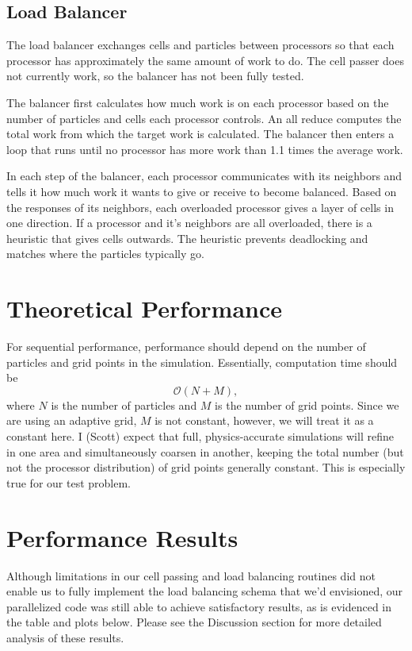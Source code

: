 \documentclass[]{article}
\begin{document}
\subsection{Load Balancer}
The load balancer exchanges cells and particles between processors so that each processor has approximately the same amount of work to do.  The cell passer does not currently work, so the balancer has not been fully tested.

The balancer first calculates how much work is on each processor based on the number of particles and cells each processor controls.  An all reduce computes the total work from which the target work is calculated.  The balancer then enters a loop that runs until no processor has more work than 1.1 times the average work.

In each step of the balancer, each processor communicates with its neighbors and tells it how much work it wants to give or receive to become balanced.  Based on the responses of its neighbors, each overloaded processor gives a layer of cells in one direction.  If a processor and it's neighbors are all overloaded, there is a heuristic that gives cells outwards.  The heuristic prevents deadlocking and matches where the particles typically go.


\section{Theoretical Performance}
For sequential performance, performance should depend on the number of particles and grid points in the simulation.  Essentially, computation time should be 
\begin{equation}
\mathcal{O}(N + M),
\end{equation}
where $N$ is the number of particles and $M$ is the number of grid points.  Since we are using an adaptive grid, $M$ is not constant, however, we will treat it as a constant here.  I (Scott) expect that full, physics-accurate simulations will refine in one area and simultaneously coarsen in another, keeping the total number (but not the processor distribution) of grid points generally constant.  This is especially true for our test problem.

\section{Performance Results}
Although limitations in our cell passing and load balancing routines did not enable us to fully implement the load balancing schema that we'd envisioned, our parallelized code was still able to achieve satisfactory results, as is evidenced in the table and plots below. Please see the Discussion section for more detailed analysis of these results.
\end{document}

